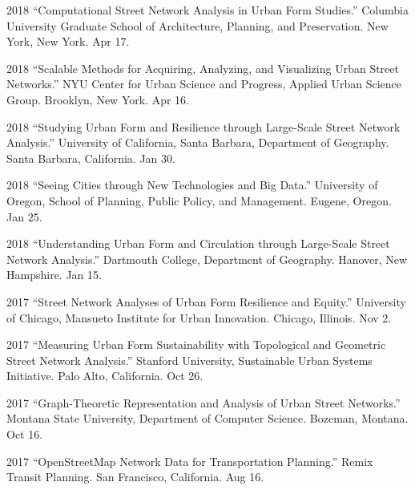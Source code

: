 \documentclass[12pt,letterpaper]{report}
\begin{document}
\begin{tablist}
		\item[2018] \tab \enquote{Computational Street Network Analysis in Urban Form Studies.} Columbia University Graduate School of Architecture, Planning, and Preservation. New York, New York. Apr 17.

		\item[2018] \tab \enquote{Scalable Methods for Acquiring, Analyzing, and Visualizing Urban Street Networks.} NYU Center for Urban Science and Progress, Applied Urban Science Group. Brooklyn, New York. Apr 16.

		\item[2018] \tab \enquote{Studying Urban Form and Resilience through Large-Scale Street Network Analysis.} University of California, Santa Barbara, Department of Geography. Santa Barbara, California. Jan 30.

		\item[2018] \tab \enquote{Seeing Cities through New Technologies and Big Data.} University of Oregon, School of Planning, Public Policy, and Management. Eugene, Oregon. Jan 25.


		\item[2018] \tab \enquote{Understanding Urban Form and Circulation through Large-Scale Street Network Analysis.} Dartmouth College, Department of Geography. Hanover, New Hampshire. Jan 15.

		\item[2017] \tab \enquote{Street Network Analyses of Urban Form Resilience and Equity.} University of Chicago, Mansueto Institute for Urban Innovation. Chicago, Illinois. Nov 2.

		\item[2017] \tab \enquote{Measuring Urban Form Sustainability with Topological and Geometric Street Network Analysis.} Stanford University, Sustainable Urban Systems Initiative. Palo Alto, California. Oct 26.

		\item[2017] \tab \enquote{Graph-Theoretic Representation and Analysis of Urban Street Networks.} Montana State University, Department of Computer Science. Bozeman, Montana. Oct 16.

		\item[2017] \tab \enquote{OpenStreetMap Network Data for Transportation Planning.} Remix Transit Planning. San Francisco, California. Aug 16.


\end{tablist}
\end{document}
